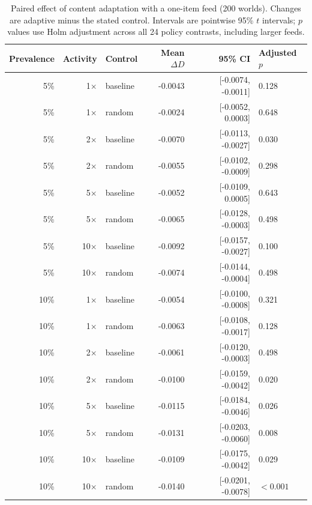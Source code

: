 \begin{table}[!htbp]
\caption{Paired effect of content adaptation with a one-item feed (200 worlds). Changes are adaptive minus the stated control. Intervals are pointwise 95\% $t$ intervals; $p$ values use Holm adjustment across all 24 policy contrasts, including larger feeds.}
\label{tab:adaptive-main}
\centering\small\setlength{\tabcolsep}{4pt}
\begin{tabular}{rrlrrl}
\hline
Prevalence & Activity & Control & Mean $\Delta D$ & 95\% CI & Adjusted $p$ \\
\hline
5\% & 1$\times$ & baseline & -0.0043 & [-0.0074, -0.0011] & 0.128 \\
5\% & 1$\times$ & random & -0.0024 & [-0.0052, 0.0003] & 0.648 \\
5\% & 2$\times$ & baseline & -0.0070 & [-0.0113, -0.0027] & 0.030 \\
5\% & 2$\times$ & random & -0.0055 & [-0.0102, -0.0009] & 0.298 \\
5\% & 5$\times$ & baseline & -0.0052 & [-0.0109, 0.0005] & 0.643 \\
5\% & 5$\times$ & random & -0.0065 & [-0.0128, -0.0003] & 0.498 \\
5\% & 10$\times$ & baseline & -0.0092 & [-0.0157, -0.0027] & 0.100 \\
5\% & 10$\times$ & random & -0.0074 & [-0.0144, -0.0004] & 0.498 \\
10\% & 1$\times$ & baseline & -0.0054 & [-0.0100, -0.0008] & 0.321 \\
10\% & 1$\times$ & random & -0.0063 & [-0.0108, -0.0017] & 0.128 \\
10\% & 2$\times$ & baseline & -0.0061 & [-0.0120, -0.0003] & 0.498 \\
10\% & 2$\times$ & random & -0.0100 & [-0.0159, -0.0042] & 0.020 \\
10\% & 5$\times$ & baseline & -0.0115 & [-0.0184, -0.0046] & 0.026 \\
10\% & 5$\times$ & random & -0.0131 & [-0.0203, -0.0060] & 0.008 \\
10\% & 10$\times$ & baseline & -0.0109 & [-0.0175, -0.0042] & 0.029 \\
10\% & 10$\times$ & random & -0.0140 & [-0.0201, -0.0078] & $<0.001$ \\
\hline
\end{tabular}
\end{table}
